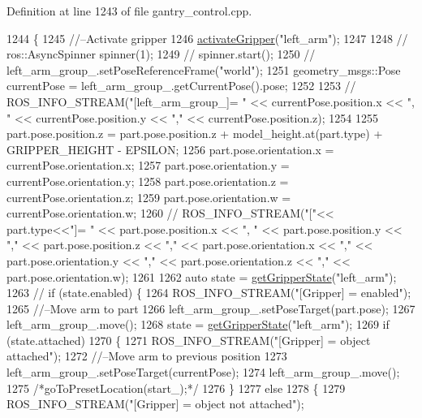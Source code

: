 Definition at line 1243 of file gantry\+\_\+control.\+cpp.


\begin{DoxyCode}
1244 \{
1245     \textcolor{comment}{//--Activate gripper}
1246     \hyperlink{classGantryControl_aaccd9c43b5564c198288ba51cbcecabe}{activateGripper}(\textcolor{stringliteral}{"left\_arm"});
1247 
1248     \textcolor{comment}{//    ros::AsyncSpinner spinner(1);}
1249     \textcolor{comment}{//    spinner.start();}
1250     \textcolor{comment}{//    left\_arm\_group\_.setPoseReferenceFrame("world");}
1251     geometry\_msgs::Pose currentPose = left\_arm\_group\_.getCurrentPose().pose;
1252 
1253     \textcolor{comment}{//    ROS\_INFO\_STREAM("[left\_arm\_group\_]= " << currentPose.position.x << ", " << currentPose.position.y
       << "," << currentPose.position.z);}
1254 
1255     part.pose.position.z = part.pose.position.z + model\_height.at(part.type) + GRIPPER\_HEIGHT - EPSILON;
1256     part.pose.orientation.x = currentPose.orientation.x;
1257     part.pose.orientation.y = currentPose.orientation.y;
1258     part.pose.orientation.z = currentPose.orientation.z;
1259     part.pose.orientation.w = currentPose.orientation.w;
1260     \textcolor{comment}{//    ROS\_INFO\_STREAM("["<< part.type<<"]= " << part.pose.position.x << ", " << part.pose.position.y <<
       "," << part.pose.position.z << "," << part.pose.orientation.x << "," << part.pose.orientation.y << "," <<
       part.pose.orientation.z << "," << part.pose.orientation.w);}
1261 
1262     \textcolor{keyword}{auto} state = \hyperlink{classGantryControl_a986691834604135cf47b1c070f8d915e}{getGripperState}(\textcolor{stringliteral}{"left\_arm"});
1263     \textcolor{comment}{//    if (state.enabled) \{}
1264     ROS\_INFO\_STREAM(\textcolor{stringliteral}{"[Gripper] = enabled"});
1265     \textcolor{comment}{//--Move arm to part}
1266     left\_arm\_group\_.setPoseTarget(part.pose);
1267     left\_arm\_group\_.move();
1268     state = \hyperlink{classGantryControl_a986691834604135cf47b1c070f8d915e}{getGripperState}(\textcolor{stringliteral}{"left\_arm"});
1269     \textcolor{keywordflow}{if} (state.attached)
1270     \{
1271         ROS\_INFO\_STREAM(\textcolor{stringliteral}{"[Gripper] = object attached"});
1272         \textcolor{comment}{//--Move arm to previous position}
1273         left\_arm\_group\_.setPoseTarget(currentPose);
1274         left\_arm\_group\_.move();
1275         \textcolor{comment}{/*goToPresetLocation(start\_);*/}
1276     \}
1277     \textcolor{keywordflow}{else}
1278     \{
1279         ROS\_INFO\_STREAM(\textcolor{stringliteral}{"[Gripper] = object not attached"});

\end{DoxyCode}
